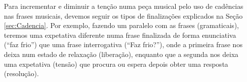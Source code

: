 \begin{example}
Para incrementar e diminuir a tenção numa peça musical pelo uso de cadências nas frases musicais,
devemos seguir os tipos de finalizações explicados na Seção \ref{sec:Cadencia}.
Por exemplo, fazendo um paralelo com as frases (gramaticais),
teremos uma expetativa diferente numa frase finalizada de forma enunciativa (``faz frio'') 
que uma frase interrogativa (``Faz frio?''), 
onde a primeira frase nos deixa num estado de relaxação (liberação),
enquanto que a segunda nos deixa uma expetativa (tensão) 
que procura ou espera depois obter uma resposta (resolução).  
\end{example}

% 

